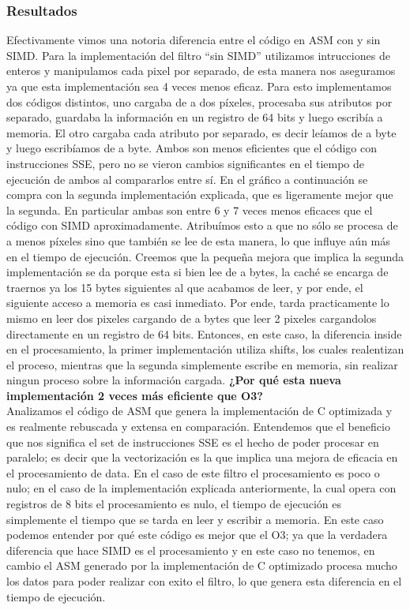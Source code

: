 \subsubsection{Resultados}
\par{Efectivamente vimos una notoria diferencia entre el código en ASM con y sin SIMD.
Para la implementación del filtro ``sin SIMD'' utilizamos intrucciones de enteros y manipulamos cada pixel por separado, de esta manera nos aseguramos ya que esta implementación sea 4 veces menos eficaz. Para esto implementamos dos códigos distintos, uno cargaba de a dos píxeles, procesaba sus atributos por separado, guardaba la información en un registro de 64 bits y luego escribía a memoria. El otro cargaba cada atributo por separado, es decir leíamos de a byte y luego escribíamos de a byte. Ambos son menos eficientes que el código con instrucciones SSE, pero no se vieron  cambios significantes en el tiempo de ejecución de ambos al compararlos entre sí. En el gráfico a continuación se compra con la segunda implementación explicada, que es ligeramente mejor que la segunda. En particular ambas son entre 6 y 7 veces menos eficaces que el código con SIMD aproximadamente. Atribuímos esto a que no sólo se procesa de a menos píxeles sino que también se lee de esta manera, lo que influye aún más en el tiempo de ejecución. Creemos que la pequeña mejora que implica la segunda implementación se da porque esta si bien lee de a bytes, la caché se encarga de traernos ya los 15 bytes siguientes al que acabamos de leer, y por ende, el siguiente acceso a memoria es casi inmediato. Por ende, tarda practicamente lo mismo en leer dos pixeles cargando de a bytes que leer 2 pixeles cargandolos directamente en un registro de 64 bits. Entonces, en este caso, la diferencia inside en el procesamiento, la primer implementación utiliza shifts, los cuales realentizan el proceso, mientras que la segunda simplemente escribe en memoria, sin realizar ningun proceso sobre la información cargada.
\textbf{¿Por qué esta nueva implementación 2 veces más eficiente que O3?} \\
Analizamos el código de ASM que genera la implementación de C optimizada y es realmente rebuscada y extensa en comparación. Entendemos que el beneficio que nos significa el set de instrucciones SSE es el hecho de poder procesar en paralelo; es decir que la vectorización es la que implica una mejora de eficacia en el procesamiento de data. En el caso de este filtro el procesamiento es poco o nulo; en el caso de la implementación explicada anteriormente, la cual opera con registros de 8 bits el procesamiento es nulo, el tiempo de ejecución es simplemente el tiempo que se tarda en leer y escribir a memoria. En este caso podemos entender por qué este código es mejor que el O3; ya que la verdadera diferencia que hace SIMD es el procesamiento y en este caso no tenemos, en cambio el ASM generado por la implementación de C optimizado procesa mucho los datos para poder realizar con exito el filtro, lo que genera esta diferencia en el tiempo de ejecución.
}
